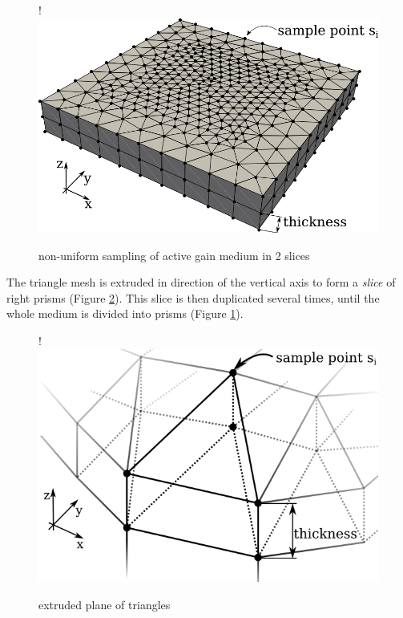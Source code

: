 \begin{figure}[H]
  \centerline{
     {!} {\includegraphics{graphics/samples_reduced.png}}
  }
  \caption{non-uniform sampling of active gain medium in 2 slices}
  \label{graphic:samples_reduced}
\end{figure}

The triangle mesh is extruded in direction of the vertical axis to form a
\emph{slice} of right prisms (Figure \ref{graphic:extruded_mesh}). This
slice is then duplicated several times, until the whole medium is divided into
prisms (Figure \ref{graphic:samples_reduced}).

\begin{figure}[H]
  \centerline{
     {!} {\includegraphics{graphics/delauny_4.png}}
  }
  \caption{extruded plane of triangles}
  \label{graphic:extruded_mesh}
\end{figure}

